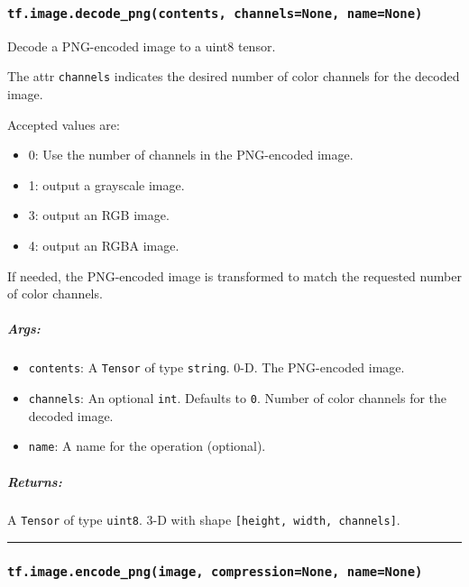 \subsubsection{\texorpdfstring{\texttt{tf.image.decode\_png(contents,\ channels=None,\ name=None)}
}{tf.image.decode\_png(contents, channels=None, name=None) }}\label{tf.image.decodeux5fpngcontents-channelsnone-namenone}

Decode a PNG-encoded image to a uint8 tensor.

The attr \texttt{channels} indicates the desired number of color
channels for the decoded image.

Accepted values are:

\begin{itemize}
\tightlist
\item
  0: Use the number of channels in the PNG-encoded image.
\item
  1: output a grayscale image.
\item
  3: output an RGB image.
\item
  4: output an RGBA image.
\end{itemize}

If needed, the PNG-encoded image is transformed to match the requested
number of color channels.

\subparagraph{Args: }\label{args-2}

\begin{itemize}
\tightlist
\item
  \texttt{contents}: A \texttt{Tensor} of type \texttt{string}. 0-D. The
  PNG-encoded image.
\item
  \texttt{channels}: An optional \texttt{int}. Defaults to \texttt{0}.
  Number of color channels for the decoded image.
\item
  \texttt{name}: A name for the operation (optional).
\end{itemize}

\subparagraph{Returns: }\label{returns-2}

A \texttt{Tensor} of type \texttt{uint8}. 3-D with shape
\texttt{{[}height,\ width,\ channels{]}}.

\begin{center}\rule{0.5\linewidth}{\linethickness}\end{center}

\subsubsection{\texorpdfstring{\texttt{tf.image.encode\_png(image,\ compression=None,\ name=None)}
}{tf.image.encode\_png(image, compression=None, name=None) }}\label{tf.image.encodeux5fpngimage-compressionnone-namenone}

